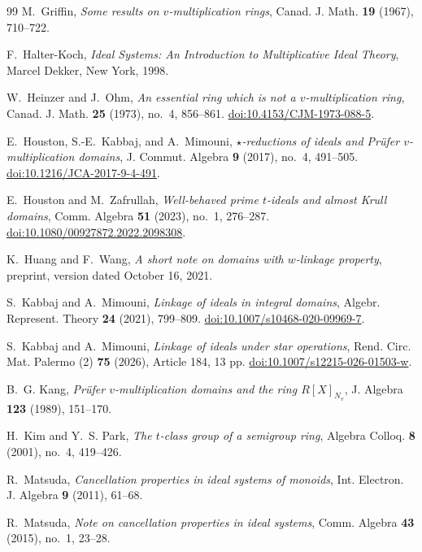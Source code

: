 \documentclass[11pt]{amsart}
\theoremstyle{definition}
\theoremstyle{remark}
\begin{document}
\begin{thebibliography}{99}
M.~Griffin,
\emph{Some results on $v$-multiplication rings},
Canad. J. Math. \textbf{19} (1967), 710--722.

F.~Halter-Koch,
\emph{Ideal Systems: An Introduction to Multiplicative Ideal Theory},
Marcel Dekker, New York, 1998.

W.~Heinzer and J.~Ohm,
\emph{An essential ring which is not a $v$-multiplication ring},
Canad. J. Math. \textbf{25} (1973), no.~4, 856--861.
\href{https://doi.org/10.4153/CJM-1973-088-5}{doi:10.4153/CJM-1973-088-5}.

E.~Houston, S.-E.~Kabbaj, and A.~Mimouni,
\emph{$\star$-reductions of ideals and Pr\"ufer $v$-multiplication domains},
J. Commut. Algebra \textbf{9} (2017), no.~4, 491--505.
\href{https://doi.org/10.1216/JCA-2017-9-4-491}{doi:10.1216/JCA-2017-9-4-491}.

E.~Houston and M.~Zafrullah,
\emph{Well-behaved prime $t$-ideals and almost Krull domains},
Comm. Algebra \textbf{51} (2023), no.~1, 276--287.
\href{https://doi.org/10.1080/00927872.2022.2098308}{doi:10.1080/00927872.2022.2098308}.

K.~Huang and F.~Wang,
\emph{A short note on domains with $w$-linkage property},
preprint, version dated October 16, 2021.

S.~Kabbaj and A.~Mimouni,
\emph{Linkage of ideals in integral domains},
Algebr. Represent. Theory \textbf{24} (2021), 799--809.
\href{https://doi.org/10.1007/s10468-020-09969-7}{doi:10.1007/s10468-020-09969-7}.

S.~Kabbaj and A.~Mimouni,
\emph{Linkage of ideals under star operations},
Rend. Circ. Mat. Palermo (2) \textbf{75} (2026), Article 184, 13 pp.
\href{https://doi.org/10.1007/s12215-026-01503-w}{doi:10.1007/s12215-026-01503-w}.

B.~G. Kang,
\emph{Pr\"ufer $v$-multiplication domains and the ring $R[X]_{N_v}$},
J. Algebra \textbf{123} (1989), 151--170.

H.~Kim and Y.~S. Park,
\emph{The $t$-class group of a semigroup ring},
Algebra Colloq. \textbf{8} (2001), no.~4, 419--426.

R.~Matsuda,
\emph{Cancellation properties in ideal systems of monoids},
Int. Electron. J. Algebra \textbf{9} (2011), 61--68.

R.~Matsuda,
\emph{Note on cancellation properties in ideal systems},
Comm. Algebra \textbf{43} (2015), no.~1, 23--28.


\end{thebibliography}
\end{document}
